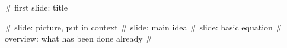 

# first slide: title

# slide: picture, put in context
# slide: main idea
# slide: basic equation
# overview: what has been done already
# 

